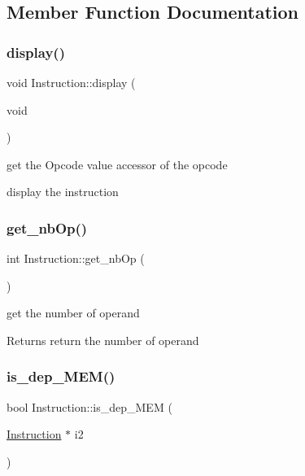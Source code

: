 \subsection{Member Function Documentation}
\mbox{\label{class_instruction_a0bae837f79caa83504ad14172bf6addf}} 
\subsubsection{\texorpdfstring{display()}{display()}}
{\footnotesize\ttfamily void Instruction\+::display (\begin{DoxyParamCaption}\item[{void}]{ }\end{DoxyParamCaption})}



get the Opcode value accessor of the opcode 

display the instruction \mbox{\label{class_instruction_a044a281355f25375a7765f24bdf614f3}} 
\subsubsection{\texorpdfstring{get\+\_\+nb\+Op()}{get\_nbOp()}}
{\footnotesize\ttfamily int Instruction\+::get\+\_\+nb\+Op (\begin{DoxyParamCaption}{ }\end{DoxyParamCaption})}



get the number of operand ~\newline
 

\begin{DoxyReturn}{Returns}
return the number of operand 
\end{DoxyReturn}
\mbox{\label{class_instruction_a28526bda91b964d7fd81f85cee02c624}} 
\subsubsection{\texorpdfstring{is\+\_\+dep\+\_\+\+M\+E\+M()}{is\_dep\_MEM()}}
{\footnotesize\ttfamily bool Instruction\+::is\+\_\+dep\+\_\+\+M\+EM (\begin{DoxyParamCaption}\item[{\mbox{\hyperlink{class_instruction}{Instruction}} $\ast$}]{i2 }\end{DoxyParamCaption})}



